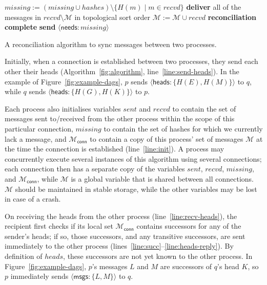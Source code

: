 \documentclass[a4paper,anonymous,USenglish]{lipics-v2019}
\begin{document}
\begin{algorithm}[p]
\begin{algorithmic}[1]
        \State $\mathit{missing} := (\mathit{missing} \cup \mathit{hashes}) \setminus \{H(m) \mid m \in \mathit{recvd}\}$
         \label{line:missing-empty}
            \Mutex
            \State \textbf{deliver} all of the messages in $\mathit{recvd} \setminus \mathcal{M}$ in topological sort order\label{line:deliver}
            \State $\mathcal{M} := \mathcal{M} \cup \mathit{recvd}$ \label{line:update-m}
            \State \textbf{reconciliation complete} \label{line:finish}
            \EndMutex
        \Else
            \State \textbf{send} $\langle\mathsf{needs}: \mathit{missing}\rangle$ \label{line:send-missing}
        \EndIf
    \EndFunction
    \end{algorithmic}
    \caption{A reconciliation algorithm to sync messages between two processes.}\label{fig:algorithm}
\end{algorithm}

Initially, when a connection is established between two processes, they send each other their heads (Algorithm~\ref{fig:algorithm}, line~\ref{line:send-heads}).
In the example of Figure~\ref{fig:example-dags}, $p$ sends $\langle\mathsf{heads}: \{H(E),H(M)\}\rangle$ to $q$, while $q$ sends $\langle\mathsf{heads}: \{H(G),H(K)\}\rangle$ to $p$.

Each process also initialises variables $\mathit{sent}$ and $\mathit{recvd}$ to contain the set of messages sent to/received from the other process within the scope of this particular connection, $\mathit{missing}$ to contain the set of hashes for which we currently lack a message, and $\mathcal{M}_\mathsf{conn}$ to contain a copy of this process' set of messages $\mathcal{M}$ at the time the connection is established (line~\ref{line:init}).
A process may concurrently execute several instances of this algorithm using several connections; each connection then has a separate copy of the variables $\mathit{sent}$, $\mathit{recvd}$, $\mathit{missing}$, and $\mathcal{M}_\mathsf{conn}$, while $\mathcal{M}$ is a global variable that is shared between all connections.
$\mathcal{M}$ should be maintained in stable storage, while the other variables may be lost in case of a crash.

On receiving the heads from the other process (line~\ref{line:recv-heads}), the recipient first checks if its local set $\mathcal{M}_\mathsf{conn}$ contains successors for any of the sender's heads; if so, those successors, and any transitive successors, are sent immediately to the other process (lines~\ref{line:succ}--\ref{line:heads-reply}).
By definition of $\mathit{heads}$, these successors are not yet known to the other process.
In Figure~\ref{fig:example-dags}, $p$'s messages $L$ and $M$ are successors of $q$'s head $K$, so $p$ immediately sends $\langle\mathsf{msgs}: \{L, M\}\rangle$ to $q$.
\end{document}
